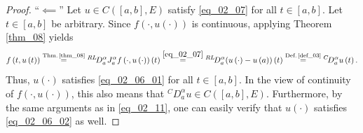 \documentclass[reqno]{amsart}
\numberwithin{equation}{section}
\theoremstyle{definition}
\theoremstyle{remark}
\newcommand{\br}[1]{\left(#1\right)}
\newcommand{\C}[2]{C\br{#1,#2}}
\newcommand{\DC}[3]{{}^{C}\!D^{#1}_{#2}{#3}}
\newcommand{\defRef}[1]{\textrm{Def.\,\ref{#1}}}
\newcommand{\DRL}[3]{{}^{RL}\!D^{#1}_{#2}{#3}}
\newcommand{\eqText}[1]{\stackrel{#1}{=}}
\newcommand{\JRL}[3]{J^{#1}_{#2}{#3}}
\newcommand{\sbr}[1]{\left[#1\right]}
\newcommand{\theoremRef}[1]{\textrm{Theorem \ref{#1}}}
\newcommand{\thmRef}[1]{\textrm{Thm.\,\ref{#1}}}
\begin{document}
\begin{proof}
	\enquote{$\impliedby$} Let $u\in\C{\sbr{a,b}}{E}$ satisfy \eqref{eq_02_07} for all $t\in\sbr{a,b}$. Let $t\in\sbr{a,b}$ be arbitrary. Since $f\br{\cdot,u\br{\cdot}}$ is continuous, applying \theoremRef{thm_08} yields
	\begin{equation*}
		f\br{t,u\br{t}}\eqText{\thmRef{thm_08}}\DRL{\alpha}{a}{\JRL{\alpha}{a}{f\br{\cdot,u\br{\cdot}}}}\br{t}\eqText{\eqref{eq_02_07}}\DRL{\alpha}{a}{\br{u\br{\cdot}-u\br{a}}}\br{t}\eqText{\defRef{def_03}}\DC{\alpha}{a}{u}\br{t}.
	\end{equation*}
	Thus, $u\br{\cdot}$ satisfies \eqref{eq_02_06_01} for all $t\in\sbr{a,b}$. In the view of continuity of $f\br{\cdot,u\br{\cdot}}$, this also means that $\DC{\alpha}{a}{u}\in\C{\sbr{a,b}}{E}$. Furthermore, by the same arguments as in \eqref{eq_02_11}, one can easily verify that $u\br{\cdot}$ satisfies \eqref{eq_02_06_02} as well.
	\end{proof}
	
\end{document}
